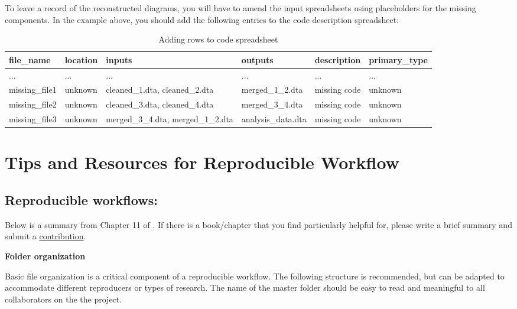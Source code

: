 \documentclass[]{book}
\begin{document}
To leave a record of the reconstructed diagrams, you will have to amend the input spreadsheets using placeholders for the missing components. In the example above, you should add the following entries to the code description spreadsheet:

\begin{table}

\caption{\label{tab:adding-rows-extra}Adding rows to code spreadsheet}
\centering
\begin{tabu} to 
\hline
file\_name & location & inputs & outputs & description & primary\_type\\
\hline
... & ... & ... & ... & ... & ...\\
\hline
missing\_file1 & unknown & cleaned\_1.dta, cleaned\_2.dta & merged\_1\_2.dta & missing code & unknown\\
\hline
missing\_file2 & unknown & cleaned\_3.dta, cleaned\_4.dta & merged\_3\_4.dta & missing code & unknown\\
\hline
missing\_file3 & unknown & merged\_3\_4.dta, merged\_1\_2.dta & analysis\_data.dta & missing code & unknown\\
\hline
\end{tabu}
\end{table}

\hypertarget{tips-and-resources-for-reproducible-workflow}{%
\chapter{Tips and Resources for Reproducible Workflow}\label{tips-and-resources-for-reproducible-workflow}}

\hypertarget{reproducible-workflows}{%
\section{Reproducible workflows:}\label{reproducible-workflows}}

Below is a summary from Chapter 11 of \citet{christensen2019transparent}. If there is a book/chapter that you find particularly helpful for, please write a brief summary and submit a \protect\hyperlink{contrib-guide}{contribution}.

\textbf{Folder organization}

Basic file organization is a critical component of a reproducible workflow. The following structure is recommended, but can be adapted to accommodate different reproducers or types of research. The name of the master folder should be easy to read and meaningful to all collaborators on the the project.
\end{document}
